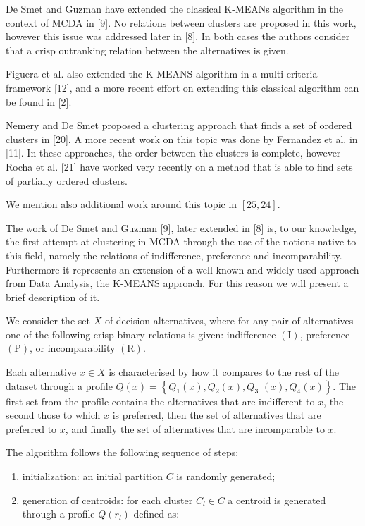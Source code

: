 \documentclass[10pt]{article}
\begin{document}
De Smet and Guzman have extended the classical K-MEANs algorithm in the context of MCDA in [9]. No relations between clusters are proposed in this work, however this issue was addressed later in [8]. In both cases the authors consider that a crisp outranking relation between the alternatives is given.

Figuera et al. also extended the K-MEANS algorithm in a multi-criteria framework [12], and a more recent effort on extending this classical algorithm can be found in [2].

Nemery and De Smet proposed a clustering approach that finds a set of ordered clusters in [20]. A more recent work on this topic was done by Fernandez et al. in [11]. In these approaches, the order between the clusters is complete, however Rocha et al. [21] have worked very recently on a method that is able to find sets of partially ordered clusters.

We mention also additional work around this topic in $[25,24]$.

The work of De Smet and Guzman [9], later extended in [8] is, to our knowledge, the first attempt at clustering in MCDA through the use of the notions native to this field, namely the relations of indifference, preference and incomparability. Furthermore it represents an extension of a well-known and widely used approach from Data Analysis, the K-MEANS approach. For this reason we will present a brief description of it.

We consider the set $X$ of decision alternatives, where for any pair of alternatives one of the following crisp binary relations is given: indifference $(\mathrm{I})$, preference $(\mathrm{P})$, or incomparability $(\mathrm{R})$.

Each alternative $x \in X$ is characterised by how it compares to the rest of the dataset through a profile $Q(x)=\left\{Q_{1}(x), Q_{2}(x), Q_{3}\right.$ $\left.(x), Q_{4}(x)\right\}$. The first set from the profile contains the alternatives that are indifferent to $x$, the second those to which $x$ is preferred, then the set of alternatives that are preferred to $x$, and finally the set of alternatives that are incomparable to $x$.

The algorithm follows the following sequence of steps:

\begin{enumerate}
  \item initialization: an initial partition $C$ is randomly generated;

  \item generation of centroids: for each cluster $C_{l} \in C$ a centroid is generated through a profile $Q\left(r_{l}\right)$ defined as:

\end{enumerate}
\end{document}
